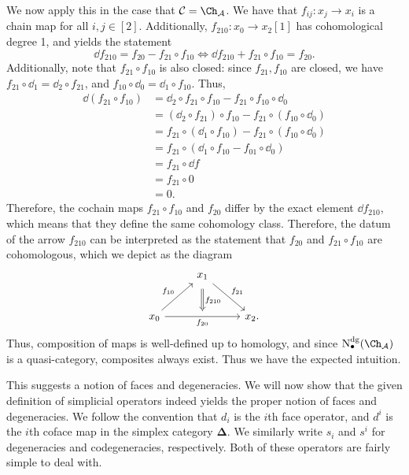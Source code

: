 We now apply this in the case that $\mathcal{C} =\Ch_{\mathcal{A} } $. We have that $f_{ij} : x_j \to x_i$ is a chain map for all $i,j\in[2]$. Additionally, $f_{210} : x_0 \to x_2[1]$ has cohomological degree 1, and yields the statement
\[
	\dd f_{210}  = f_{20} -f_{21} \circ f_{10} \iff \dd f_{210} +f_{21} \circ f_{10} =f_{20} 
.\]
Additionally, note that $f_{21} \circ f_{10} $ is also closed: since $f_{21} ,f_{10} $ are closed, we have $f_{21} \circ \dd _1 = \dd _2 \circ f_{21} $, and $f_{10} \circ \dd _0=\dd _1\circ f_{10} $. Thus,
\begin{align*}
	\dd (f_{21} \circ f_{10} ) &= \dd _2 \circ f_{21}\circ f_{10} - f_{21} \circ f_{10} \circ \dd _0\\
				  &= (\dd _2 \circ f_{21} )\circ f_{10} - f_{21} \circ (f_{10} \circ \dd _0) \\
				  &=f_{21} \circ (\dd _1 \circ f_{10} ) - f_{21} \circ (f_{10} \circ \dd _0)\\
				  &=f_{21} \circ (\dd _1\circ f_{10} -f_{01} \circ \dd _0)\\
				  &=f_{21} \circ \dd f\\
				  &=f_{21} \circ 0\\
				  &=0
.\end{align*}
Therefore, the cochain maps $f_{21} \circ f_{10} $ and $f_{20} $ differ by the exact element $\dd f_{210} $, which means that they define the same cohomology class. Therefore, the datum of the arrow $f_{210} $ can be interpreted as the statement that $f_{20} $ and $f_{21} \circ f_{10} $ are cohomologous, which we depict as the diagram
\[\begin{tikzcd}[row sep = 2.5em, column sep = 2.5em]
 & x_1 \ar[" f_{21}  ", dr]  &  \\
	x_0 \ar[" f_{10}  ", ur] \ar[" f_{20}  "'{name=x}, rr]  &  & x_2.
	\arrow[from=1-2, to=x, Rightarrow, " f_{210}  ", shorten=5px]
\end{tikzcd}\]
Thus, composition of maps is well-defined up to homology, and since $\mathrm{N} ^{\mathrm{dg} } _{\bullet} (\Ch_{\mathcal{A} } )$ is a quasi-category, composites always exist. Thus we have the expected intuition.

This suggests a notion of faces and degeneracies. We will now show that the given definition of simplicial operators indeed yields the proper notion of faces and degeneracies. We follow the convention that $d_i$ is the $i$th face operator, and $d^i$ is the $i$th coface map in the simplex category $\boldsymbol{\Delta}$. We similarly write $s_i$ and $s^i$ for degeneracies and codegeneracies, respectively. Both of these operators are fairly simple to deal with.


